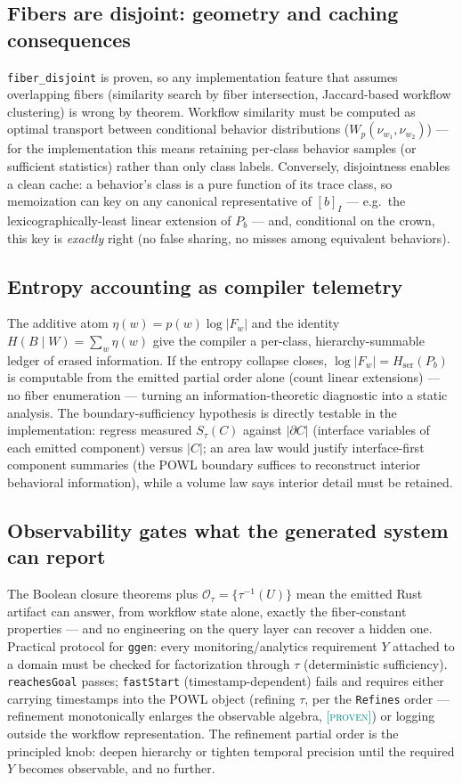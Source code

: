 \documentclass[11pt]{article}
\newcommand{\PROVEN}{\textcolor{teal}{\textsc{[proven]}}}
\newcommand{\tmap}{\tau}                       %
\newcommand{\fib}[1]{F_{#1}}                   %
\newcommand{\Hser}{H_{\mathrm{ser}}}
\theoremstyle{plain}
\theoremstyle{definition}
\begin{document}
\subsection{Fibers are disjoint: geometry and caching consequences}
\texttt{fiber\_disjoint} is proven, so any implementation feature that
assumes overlapping fibers (similarity search by fiber intersection,
Jaccard-based workflow clustering) is wrong by theorem. Workflow similarity
must be computed as optimal transport between conditional behavior
distributions ($W_p(\nu_{w_1}, \nu_{w_2})$) --- for the implementation this
means retaining per-class behavior samples (or sufficient statistics) rather
than only class labels. Conversely, disjointness enables a clean cache: a
behavior's class is a pure function of its trace class, so memoization can
key on any canonical representative of $[b]_I$ --- e.g.\ the
lexicographically-least linear extension of $P_b$ --- and, conditional on
the crown, this key is \emph{exactly} right (no false sharing, no misses
among equivalent behaviors).

\subsection{Entropy accounting as compiler telemetry}
The additive atom $\eta(w) = p(w)\log|\fib{w}|$ and the identity
$H(B \mid W) = \sum_w \eta(w)$ give the compiler a per-class,
hierarchy-summable ledger of erased information. If the entropy collapse
closes, $\log|\fib{w}| = \Hser(P_b)$ is computable from the emitted partial
order alone (count linear extensions) --- no fiber enumeration --- turning an
information-theoretic diagnostic into a static analysis. The
boundary-sufficiency hypothesis is directly testable in the implementation:
regress measured $S_\tmap(C)$ against $|\partial C|$ (interface variables of
each emitted component) versus $|C|$; an area law would justify
interface-first component summaries (the POWL boundary suffices to
reconstruct interior behavioral information), while a volume law says
interior detail must be retained.

\subsection{Observability gates what the generated system can report}
The Boolean closure theorems plus
$\mathcal{O}_\tmap = \{\tmap^{-1}(U)\}$ mean the emitted Rust artifact can
answer, from workflow state alone, exactly the fiber-constant properties ---
and no engineering on the query layer can recover a hidden one. Practical
protocol for \texttt{ggen}: every monitoring/analytics requirement $Y$
attached to a domain must be checked for factorization through $\tmap$
(deterministic sufficiency). \texttt{reachesGoal} passes; \texttt{fastStart}
(timestamp-dependent) fails and requires either carrying timestamps into the
POWL object (refining $\tmap$, per the \texttt{Refines} order --- refinement
monotonically enlarges the observable algebra, \PROVEN) or logging outside
the workflow representation. The refinement partial order is the principled
knob: deepen hierarchy or tighten temporal precision until the required $Y$
becomes observable, and no further.
\end{document}
